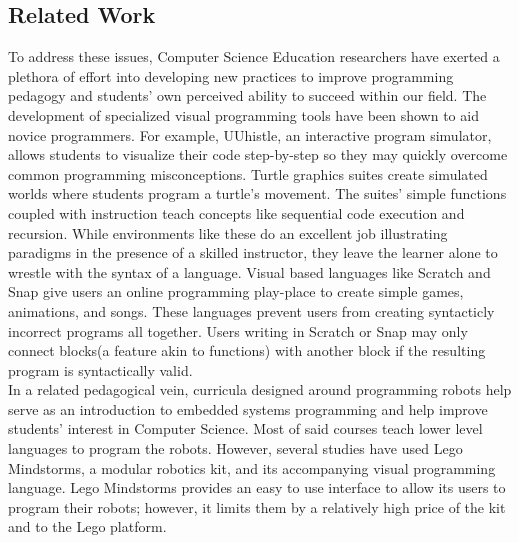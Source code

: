 \documentclass[12pt]{article}
\begin{document}
\subsection {Related Work} 
To address these issues, Computer Science Education researchers have exerted a plethora of effort into developing new practices to improve programming pedagogy and students' own perceived ability to succeed within our field. The development of specialized visual programming tools have been shown to aid novice programmers. For example, UUhistle, an interactive program simulator, allows students to visualize their code step-by-step so they may quickly overcome common programming misconceptions.\cite{UUhistle} Turtle graphics suites create simulated worlds where students program a turtle's movement. The suites' simple functions coupled with instruction teach concepts like sequential code execution and recursion.\cite{greenfoot}\cite{CS1forScientists} While environments like these do an excellent job illustrating paradigms in the presence of a skilled instructor, they leave the learner alone to wrestle with the syntax of a language. Visual based languages like Scratch and Snap give users an online programming play-place to create simple games, animations, and songs. These languages prevent users from creating syntacticly incorrect programs all together. Users writing in Scratch or Snap may only connect blocks(a feature akin to functions) with another block if the resulting program is syntactically valid.\cite{Scratch} 
 \\[7pt]
 In a related pedagogical vein, curricula designed around programming robots help serve as an introduction to embedded systems programming and help improve students' interest in Computer Science.\cite{PersonalizingCS1}\cite{RobotMotivation}\cite {elementaryRobots}\cite{cRobots}\cite{primarySchool} Most of said courses teach lower level languages to program the robots. However, several studies have used Lego Mindstorms, a modular robotics kit, and its accompanying visual programming language.\cite{legomindstorms}\cite{legomindstorms2} Lego Mindstorms provides an easy to use interface to allow its users to program their robots; however, it limits them by a relatively high price of the kit and to the Lego platform.
\end{document}
